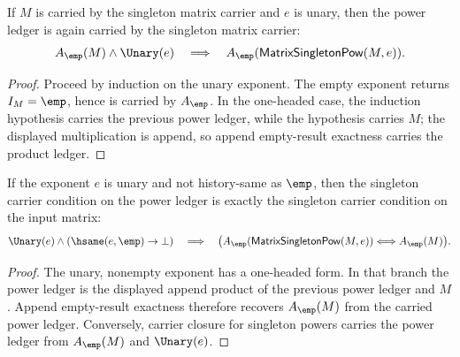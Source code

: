 \begin{theorem}
\label{thm:matrix-singleton-pow-carrier-closed}
If $M$ is carried by the singleton matrix carrier and $e$ is unary, then the
power ledger is again carried by the singleton matrix carrier:
$$
A_{\emp}(M)\land \Unary(e)
\quad\Longrightarrow\quad
A_{\emp}(\mathsf{MatrixSingletonPow}(M,e)).
$$
\end{theorem}
\begin{proof}
Proceed by induction on the unary exponent. The empty exponent returns
$I_M=\emp$, hence is carried by $A_{\emp}$. In the one-headed case, the
induction hypothesis carries the previous power ledger, while the hypothesis
carries $M$; the displayed multiplication is append, so append empty-result
exactness carries the product ledger.
\end{proof}

\begin{theorem}
\label{thm:matrix-singleton-pow-carrier-nonempty-unary-input}
If the exponent $e$ is unary and not history-same as $\emp$, then the singleton
carrier condition on the power ledger is exactly the singleton carrier
condition on the input matrix:
$$
\Unary(e)\land(\hsame(e,\emp)\to\bot)
\quad\Longrightarrow\quad
\bigl(
A_{\emp}(\mathsf{MatrixSingletonPow}(M,e))
\Longleftrightarrow
A_{\emp}(M)
\bigr).
$$
\end{theorem}
\begin{proof}
The unary, nonempty exponent has a one-headed form. In that branch the power
ledger is the displayed append product of the previous power ledger and $M$.
Append empty-result exactness therefore recovers $A_{\emp}(M)$ from the carried
power ledger. Conversely, carrier closure for singleton powers carries the
power ledger from $A_{\emp}(M)$ and $\Unary(e)$.
\end{proof}

